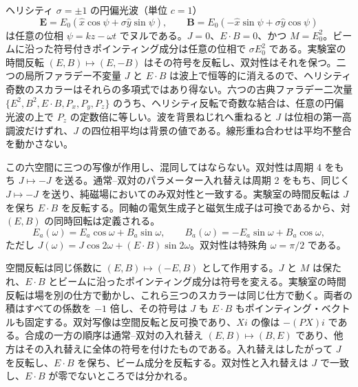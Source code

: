 \documentclass[a4paper]{article}
\begin{document}
ヘリシティ $\sigma=\pm 1$ の円偏光波（単位 $c=1$）
\[
\mathbf{E}=E_0(\hat{x}\cos\psi+\sigma\hat{y}\sin\psi),\qquad
\mathbf{B}=E_0(-\hat{x}\sin\psi+\sigma\hat{y}\cos\psi)
\]
は任意の位相 $\psi=kz-\omega t$ でヌルである。$J=0$、$E\cdot B=0$、かつ $M=E_0^2$。ビームに沿った符号付きポインティング成分は任意の位相で $\sigma E_0^2$ である。実験室の時間反転 $(E,B)\mapsto(E,-B)$ はその符号を反転し、双対性はそれを保つ。二つの局所ファラデー不変量 $J$ と $E\cdot B$ は波上で恒等的に消えるので、ヘリシティ奇数のスカラーはそれらの多項式ではあり得ない。六つの古典ファラデー二次量 $\{E^2,B^2,E\cdot B,P_x,P_y,P_z\}$ のうち、ヘリシティ反転で奇数な結合は、任意の円偏光波の上で $P_z$ の定数倍に等しい。波を背景ねじれへ重ねると $J$ は位相の第一高調波だけずれ、$J$ の四位相平均は背景の値である。線形重ね合わせは平均不整合を動かさない。

この六空間に三つの写像が作用し、混同してはならない。双対性は周期 4 をもち $J\mapsto -J$ を送る。通常--双対のパラメーター入れ替えは周期 2 をもち、同じく $J\mapsto -J$ を送り、純磁場においてのみ双対性と一致する。実験室の時間反転は $J$ を保ち $E\cdot B$ を反転する。同軸の電気生成子と磁気生成子は可換であるから、対 $(E,B)$ の同時回転は定義される。
\[
E_a(\omega)=E_a\cos\omega+B_a\sin\omega,\qquad
B_a(\omega)=-E_a\sin\omega+B_a\cos\omega,
\]
ただし $J(\omega)=J\cos 2\omega+(E\cdot B)\sin 2\omega$。双対性は特殊角 $\omega=\pi/2$ である。

空間反転は同じ係数に $(E,B)\mapsto(-E,B)$ として作用する。$J$ と $M$ は保たれ、$E\cdot B$ とビームに沿ったポインティング成分は符号を変える。実験室の時間反転は場を別の仕方で動かし、これら三つのスカラーは同じ仕方で動く。両者の積はすべての係数を $-1$ 倍し、その符号は $J$ も $E\cdot B$ もポインティング・ベクトルも固定する。双対写像は空間反転と反可換であり、$Xi$ の像は $-(PX)i$ である。合成の一方の順序は通常--双対の入れ替え $(E,B)\mapsto(B,E)$ であり、他方はその入れ替えに全体の符号を付けたものである。入れ替えはしたがって $J$ を反転し、$E\cdot B$ を保ち、ビーム成分を反転する。双対性と入れ替えは $J$ で一致し、$E\cdot B$ が零でないところでは分かれる。
\end{document}
